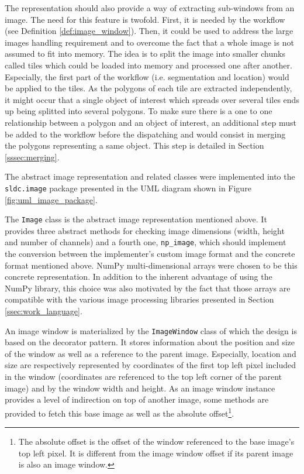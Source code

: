 The representation should also provide a way of extracting sub-windows from an image. The need for this feature is twofold. First, it is needed by the workflow (see Definition \ref{def:image_window}). Then, it could be used to address the large images handling requirement and to overcome the fact that a whole image is not assumed to fit into memory. The idea is to split the image into smaller chunks called tiles which could be loaded into memory and processed one after another. Especially, the first part of the workflow (i.e. segmentation and location) would be applied to the tiles. As the polygons of each tile are extracted independently, it might occur that a single object of interest which spreads over several tiles ends up being splitted into several polygons. To make sure there is a one to one relationship between a polygon and an object of interest, an additional step must be added to the workflow before the dispatching and would consist in merging the polygons representing a same object. This step is detailed in Section \ref{sssec:merging}.

The abstract image representation and related classes were implemented into the \texttt{sldc.image} package presented in the UML diagram shown in Figure \ref{fig:uml_image_package}.

The \texttt{Image} class is the abstract image representation mentioned above. It provides three abstract methods for checking image dimensions (width, height and number of channels) and a fourth one, \texttt{np\_image}, which should implement the conversion between the implementer's custom image format and the concrete format mentioned above. NumPy multi-dimensional arrays were chosen to be this concrete representation. In addition to the inherent advantage of using the NumPy library, this choice was also motivated by the fact that those arrays are compatible with the various image processing libraries presented in Section \ref{ssec:work_language}. 

An image window is materialized by the \texttt{ImageWindow} class of which the design is based on the decorator pattern. It stores information about the position and size of the window as well as a reference to the parent image. Especially, location and size are respectively represented by coordinates of the first top left pixel included in the window (coordinates are referenced to the top left corner of the parent image) and by the window width and height. As an image window instance provides a level of indirection on top of another image, some methods are provided to fetch this base image as well as the absolute offset\footnote{The absolute offset is the offset of the window referenced to the base image's top left pixel. It is different from the image window offset if its parent image is also an image window.}.

